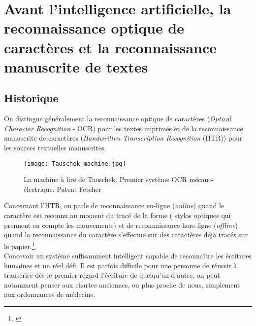 \section{Avant l'intelligence artificielle, la reconnaissance optique de caractères et la reconnaissance manuscrite de textes}\label{Histoire_fonctionnement_HTR}

\subsection{Historique}

On distingue généralement la reconnaissance optique de caractères (\textit{Optical Character Recognition} - OCR)
pour les textes imprimés et de la reconnaissance manuscrite de caractères (\textit{Handwritten Transcription Recognition} (HTR)) pour les sources textuelles manuscrites.\\

\begin{wrapfigure}[14]{r}{9cm}
    \centering
    \texttt{[image: Tauschek\_machine.jpg]}
    \caption{La machine à lire de Tauschek. Premier système OCR mécano-électrique. \textcopyright Patent Fetcher}
    \label{fig:tauschek_machine}
\end{wrapfigure}

Concernant l'HTR, on parle de reconnaissance en-ligne (\textit{online}) quand le caractère est reconnu au moment du tracé de la forme ( stylos optiques qui prennent en compte les mouvements) et de reconnaissance hors-ligne (\textit{offline}) quand la reconnaissance du caractère s'effectue sur des caractères déjà tracés sur le papier.\footnote{\cite{eikvil_ocr_1993}}. \\

Concevoir un système suffisamment intelligent capable de reconnaître les écritures humaines et un réel défi. Il est parfois difficile pour une personne de réussir à transcrire dès le premier regard l'écriture de quelqu'un d'autre, on peut notamment penser aux chartes anciennes, ou plus proche de nous, simplement aux ordonnances de médecins.

